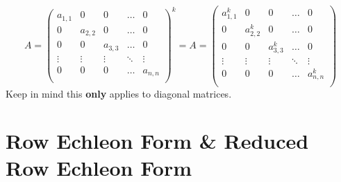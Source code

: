 \documentclass[a4paper]{article}
\begin{document}
  \[
    A = \begin{pmatrix}
      a_{1,1} & 0 & 0& \dots & 0 \\
      0 & a_{2,2} & 0&\dots & 0 \\
      0 & 0 & a_{3,3}&\dots & 0 \\
      \vdots & \vdots & \vdots&\ddots & \vdots\\
      0 & 0 & 0&\dots & a_{n,n} \\
    \end{pmatrix}^k = 
    A = \begin{pmatrix}
      a_{1,1}^k & 0 & 0& \dots & 0 \\
      0 & a_{2,2}^k & 0&\dots & 0 \\
      0 & 0 & a_{3,3}^k&\dots & 0 \\
      \vdots & \vdots & \vdots&\ddots & \vdots\\
      0 & 0 & 0&\dots & a_{n,n}^k \\
    \end{pmatrix}
  \]
  Keep in mind this \textbf{only} applies to diagonal matrices.
  \section{Row Echleon Form \& Reduced Row Echleon Form} 
\end{document}
